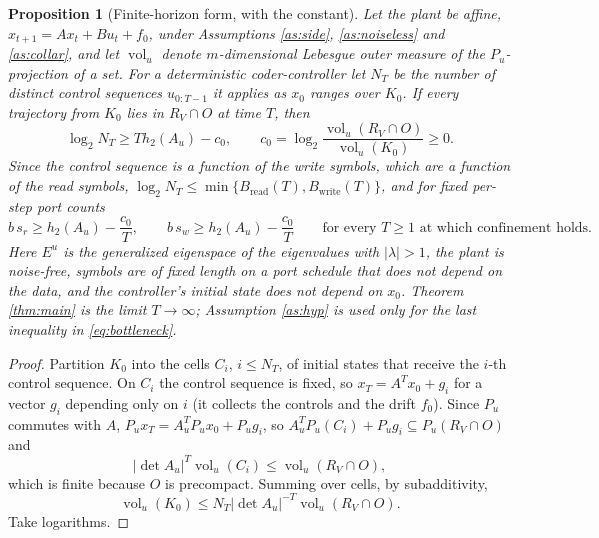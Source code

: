 \documentclass[11pt]{article}
\newtheorem{proposition}{Proposition}[section]
\theoremstyle{definition}
\theoremstyle{remark}
\newcommand{\RV}{R_V}
\newcommand{\Eu}{E^u}
\newcommand{\Pu}{P_u}
\newcommand{\Au}{A_u}
\newcommand{\htwo}{h_2}
\newcommand{\sr}{s_r}
\newcommand{\sw}{s_w}
\newcommand{\volu}{\operatorname{vol}_u}
\begin{document}
\begin{proposition}[Finite-horizon form, with the constant]\label{prop:fh}
Let the plant be affine, $x_{t+1}=Ax_t+Bu_t+f_0$, under Assumptions \ref{as:side}, \ref{as:noiseless} and \ref{as:collar}, and let $\volu$ denote $m$-dimensional Lebesgue outer measure of the $\Pu$-projection of a set. For a deterministic coder-controller let $N_T$ be the number of distinct control sequences $u_{0:T-1}$ it applies as $x_0$ ranges over $K_0$. If every trajectory from $K_0$ lies in $\RV\cap O$ at time $T$, then
\begin{equation}
\log_2N_T\ge T\htwo(\Au)-c_0,\qquad c_0=\log_2\frac{\volu(\RV\cap O)}{\volu(K_0)}\ge0. \tag{FH}\label{eq:FH}
\end{equation}
Since the control sequence is a function of the write symbols, which are a function of the read symbols, $\log_2N_T\le\min\{B_{\mathrm{read}}(T),B_{\mathrm{write}}(T)\}$, and for fixed per-step port counts
\begin{equation*}
b\,\sr\ge\htwo(\Au)-\frac{c_0}{T},\qquad b\,\sw\ge\htwo(\Au)-\frac{c_0}{T}\qquad\text{for every }T\ge1\text{ at which confinement holds.}
\end{equation*}
Here $\Eu$ is the generalized eigenspace of the eigenvalues with $|\lambda|>1$, the plant is noise-free, symbols are of fixed length on a port schedule that does not depend on the data, and the controller's initial state does not depend on $x_0$. Theorem \ref{thm:main} is the limit $T\to\infty$; Assumption \ref{as:hyp} is used only for the last inequality in \eqref{eq:bottleneck}.
\end{proposition}
\begin{proof}
Partition $K_0$ into the cells $C_i$, $i\le N_T$, of initial states that receive the $i$-th control sequence. On $C_i$ the control sequence is fixed, so $x_T=A^Tx_0+g_i$ for a vector $g_i$ depending only on $i$ (it collects the controls and the drift $f_0$). Since $\Pu$ commutes with $A$, $\Pu x_T=\Au^T\Pu x_0+\Pu g_i$, so $\Au^T\Pu(C_i)+\Pu g_i\subseteq\Pu(\RV\cap O)$ and
\begin{equation*}
|\det\Au|^T\volu(C_i)\le\volu(\RV\cap O),
\end{equation*}
which is finite because $O$ is precompact. Summing over cells, by subadditivity,
\begin{equation*}
\volu(K_0)\le N_T|\det\Au|^{-T}\volu(\RV\cap O).
\end{equation*}
Take logarithms.
\end{proof}
\end{document}
